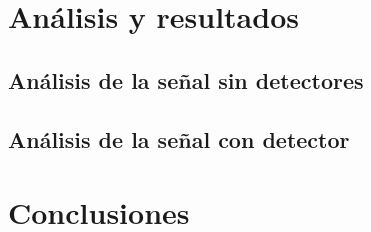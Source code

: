 \documentclass[12pt]{report}
\begin{document}
    
	
        

\chapter{Análisis y resultados}


	\section{Análisis de la señal sin detectores}
	
	
	\section{Análisis de la señal con detector}
    
    
\chapter*{Conclusiones}


    





\end{document}
